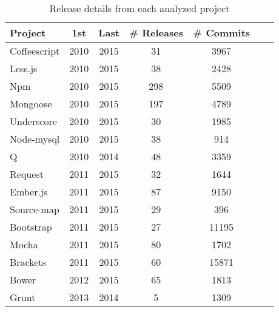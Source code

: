 \begin{table}[!hbt]
	\begin{center}
		\caption{Release details from each analyzed project}
		\label{tab:release_details}
		\begin{tabular}{l| c c c c c c}
			\toprule
			\textbf{Project} & \textbf{1st} & \textbf{Last}  & \textbf{\# Releases} & \textbf{\# Commits} \\ \midrule
			Coffeescript & 2010    & 2015  &    31 &      3967 \\
			Less.js      & 2010    & 2015  &    38 &      2428 \\
			Npm          & 2010    & 2015  &   298 &      5509 \\
			Mongoose     & 2010    & 2015  &   197 &      4789 \\
			Underscore   & 2010    & 2015  &    30 &      1985 \\
			Node-mysql   & 2010    & 2015  &    38 &       914 \\
			Q            & 2010    & 2014  &    48 &      3359 \\
			Request      & 2011    & 2015  &    32 &      1644 \\
			Ember.js     & 2011    & 2015  &    87 &      9150 \\
			Source-map   & 2011    & 2015  &    29 &       396 \\
			Bootstrap    & 2011    & 2015  &    27 &     11195 \\
			Mocha        & 2011    & 2015  &    80 &      1702 \\
			Brackets     & 2011    & 2015  &    60 &     15871 \\
			Bower        & 2012    & 2015  &    65 &      1813 \\
			Grunt        & 2013    & 2014  &     5 &      1309 \\ \bottomrule
		\end{tabular}
	\end{center}
\end{table}
